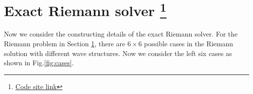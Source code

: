 \documentclass[review]{elsarticle}
\begin{document}
\section{Exact Riemann solver \footnote{\href{https://nbviewer.jupyter.org/github/bfly123/Exact-Elastic-plastic-Riemann-Solver-/blob/master/\%20CharacteristicForPlasticStateAfterYielding.ipynb\#}{Code site link}}} \label{sec:riemann}


Now we consider the constructing details of the exact  Riemann  solver. For  the Riemann problem in Section \ref{sec:riemann}, there are  $6\times 6$ possible  cases in the Riemann solution with different wave structures. Now we consider the  left six cases as shown in Fig.\ref{fig:cases}.
\end{document}
